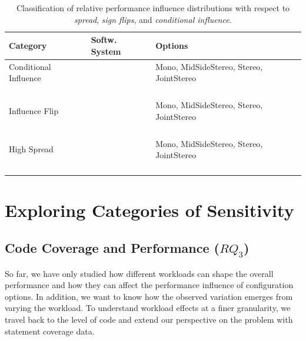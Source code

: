 {\begin{table}[ht!]
	\centering
	\footnotesize
	\caption{Classification of relative performance influence distributions with respect to \textit{spread}, \textit{sign flips}, and \textit{conditional influence.}}
	\begin{tabular}{p{1cm}p{1.5cm}p{4.6cm}} %
		\toprule
		\textbf{Category} & \textbf{Softw. System} & \textbf{Options} \\
		\midrule
		Conditional Influence & \jumper & \textsf{Mono, MidSideStereo, Stereo, JointStereo}\\
		\cmidrule{2-3}
		 & \kanzi & \\
		 \cmidrule{2-3}
		 & \dconvert & \\
		 \cmidrule{2-3}
		 & \htwo & \\
		 \cmidrule{2-3}
		 & \batik & \\
		\midrule
		Influence Flip & \jumper & \textsf{Mono, MidSideStereo, Stereo, JointStereo}\\
		\cmidrule{2-3}
		& \kanzi & \\
		\cmidrule{2-3}
		& \dconvert & \\
		\cmidrule{2-3}
		& \htwo & \\
		\cmidrule{2-3}
		& \batik & \\
		\midrule
		High Spread & \jumper & \textsf{Mono, MidSideStereo, Stereo, JointStereo}\\
		\cmidrule{2-3}
		& \kanzi & \\
		\cmidrule{2-3}
		& \dconvert & \\
		\cmidrule{2-3}
		& \htwo & \\
		\cmidrule{2-3}
		& \batik & \\
		\bottomrule
	\end{tabular}	
\label{tab:option_classification}
\end{table}

\vspace{2mm}

\clearpage
\section{Exploring Categories of Sensitivity}\label{sec:categories}
\subsection{Code Coverage and Performance ($RQ_3$)}\label{sec:rq3}
So far, we have only studied how different workloads can shape the overall performance and how they can affect the performance influence of configuration options. In addition, we want to know how the observed variation emerges from  varying the workload. To understand workload effects at a finer granularity, we travel back to the level of code and extend our perspective on the problem with statement coverage data. 

}
